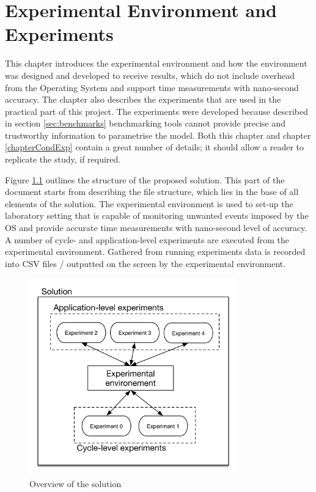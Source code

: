 
\chapter{Experimental Environment and Experiments} %



\ifpdf
    \graphicspath{{X/figures/PNG/}{X/figures/PDF/}{X/figures/}}
\else
    \graphicspath{{X/figures/EPS/}{X/figures/}}
\fi



This chapter introduces the experimental environment and how the environment was designed and developed to receive results, which do not include overhead from the Operating System and support time measurements with nano-second accuracy. The chapter also describes the experiments that are used in the practical part of this project. The experiments were developed because described in section \ref{sec:benchmarks} benchmarking tools cannot provide precise and trustworthy information to parametrise the model. Both this chapter and chapter \ref{chapterCondExp} contain a great number of details; it should allow a reader to replicate the study, if required.

Figure \ref{exp_env_exp} outlines the structure of the proposed solution. This part of the document starts from describing the file structure, which lies in the base of all elements of the solution. The experimental environment is used to set-up the laboratory setting that is capable of monitoring unwanted events imposed by the OS and provide accurate time measurements with nano-second level of accuracy. A number of cycle- and application-level experiments are executed from the experimental environment. Gathered from running experiments data is recorded into CSV files / outputted on the screen by the experimental environment.

\begin{figure}[ht!]
\centering
\includegraphics[width=90mm]{4/exp_env_exp.png}
\caption{Overview of the solution}
\label{exp_env_exp}
\end{figure}


